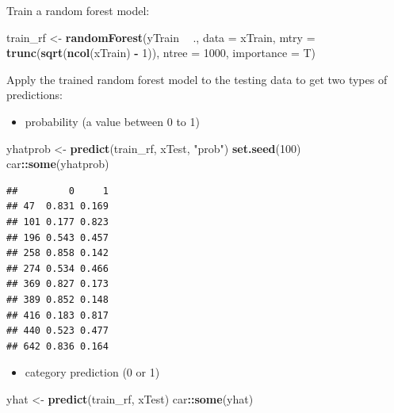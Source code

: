 \documentclass[12pt,]{krantz}
\makeatletter
\newenvironment{Shaded}{\begin{snugshade}}{\end{snugshade}}
\newcommand{\DataTypeTok}[1]{\textcolor[rgb]{0.27,0.27,0.27}{#1}}
\newcommand{\DecValTok}[1]{\textcolor[rgb]{0.06,0.06,0.06}{#1}}
\newcommand{\KeywordTok}[1]{\textcolor[rgb]{0.27,0.27,0.27}{\textbf{#1}}}
\newcommand{\NormalTok}[1]{#1}
\newcommand{\OperatorTok}[1]{\textcolor[rgb]{0.43,0.43,0.43}{\textbf{#1}}}
\newcommand{\StringTok}[1]{\textcolor[rgb]{0.5,0.5,0.5}{#1}}
\providecommand{\tightlist}{%
  \setlength{\itemsep}{0pt}\setlength{\parskip}{0pt}}
\newenvironment{kframe}{%
\medskip{}
\setlength{\fboxsep}{.8em}
 \def\at@end@of@kframe{}%
 \ifinner\ifhmode%
  \def\at@end@of@kframe{\end{minipage}}%
  \begin{minipage}{\columnwidth}%
 \fi\fi%
 \def\FrameCommand##1{\hskip\@totalleftmargin \hskip-\fboxsep
 \colorbox{shadecolor}{##1}\hskip-\fboxsep
     \hskip-\linewidth \hskip-\@totalleftmargin \hskip\columnwidth}%
 \MakeFramed {\advance\hsize-\width
   \@totalleftmargin\z@ \linewidth\hsize
   \@setminipage}}%
 {\par\unskip\endMakeFramed%
 \at@end@of@kframe}
\renewenvironment{Shaded}{\begin{kframe}}{\end{kframe}}
\makeatother
\begin{document}
Train a random forest model:

\begin{Shaded}
\begin{Highlighting}[]
\NormalTok{train_rf <-}\StringTok{ }\KeywordTok{randomForest}\NormalTok{(yTrain }\OperatorTok{~}\StringTok{ }\NormalTok{., }
                         \DataTypeTok{data =}\NormalTok{ xTrain, }
                         \DataTypeTok{mtry =} \KeywordTok{trunc}\NormalTok{(}\KeywordTok{sqrt}\NormalTok{(}\KeywordTok{ncol}\NormalTok{(xTrain) }\OperatorTok{-}\StringTok{ }\DecValTok{1}\NormalTok{)),}
                         \DataTypeTok{ntree =} \DecValTok{1000}\NormalTok{, }
                         \DataTypeTok{importance =}\NormalTok{ T)}
\end{Highlighting}
\end{Shaded}

Apply the trained random forest model to the testing data to get two types of predictions:

\begin{itemize}
\tightlist
\item
  probability (a value between 0 to 1)
\end{itemize}

\begin{Shaded}
\begin{Highlighting}[]
\NormalTok{yhatprob <-}\StringTok{ }\KeywordTok{predict}\NormalTok{(train_rf, xTest, }\StringTok{"prob"}\NormalTok{)}
\KeywordTok{set.seed}\NormalTok{(}\DecValTok{100}\NormalTok{)}
\NormalTok{car}\OperatorTok{::}\KeywordTok{some}\NormalTok{(yhatprob)}
\end{Highlighting}
\end{Shaded}

\begin{verbatim}
##         0     1
## 47  0.831 0.169
## 101 0.177 0.823
## 196 0.543 0.457
## 258 0.858 0.142
## 274 0.534 0.466
## 369 0.827 0.173
## 389 0.852 0.148
## 416 0.183 0.817
## 440 0.523 0.477
## 642 0.836 0.164
\end{verbatim}

\begin{itemize}
\tightlist
\item
  category prediction (0 or 1)
\end{itemize}

\begin{Shaded}
\begin{Highlighting}[]
\NormalTok{yhat <-}\StringTok{ }\KeywordTok{predict}\NormalTok{(train_rf, xTest)}
\NormalTok{car}\OperatorTok{::}\KeywordTok{some}\NormalTok{(yhat)}
\end{Highlighting}
\end{Shaded}
\end{document}
